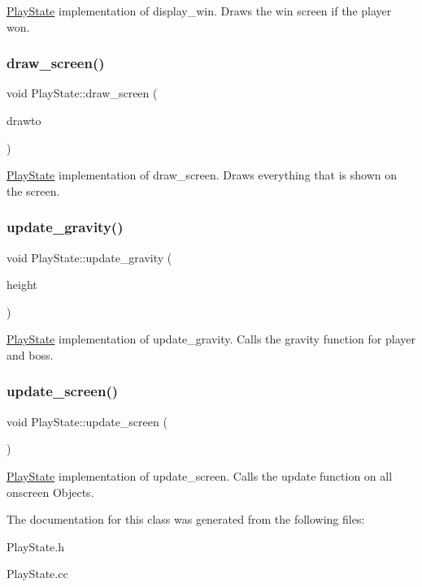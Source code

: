 \hyperlink{classPlayState}{Play\+State} implementation of display\+\_\+win. Draws the win screen if the player won. \mbox{\label{classPlayState_aaa2a573ca80d8625e9580726cd501a34}} 
\subsubsection{\texorpdfstring{draw\+\_\+screen()}{draw\_screen()}}
{\footnotesize\ttfamily void Play\+State\+::draw\+\_\+screen (\begin{DoxyParamCaption}\item[{sf\+::\+Render\+Window \&}]{drawto }\end{DoxyParamCaption})}

\hyperlink{classPlayState}{Play\+State} implementation of draw\+\_\+screen. Draws everything that is shown on the screen. \mbox{\label{classPlayState_a493525123b54430675cd78747aee4571}} 
\subsubsection{\texorpdfstring{update\+\_\+gravity()}{update\_gravity()}}
{\footnotesize\ttfamily void Play\+State\+::update\+\_\+gravity (\begin{DoxyParamCaption}\item[{float const}]{height }\end{DoxyParamCaption})}

\hyperlink{classPlayState}{Play\+State} implementation of update\+\_\+gravity. Calls the gravity function for player and boss. \mbox{\label{classPlayState_af27c539c003adda5ca10736ef8d2a9b9}} 
\subsubsection{\texorpdfstring{update\+\_\+screen()}{update\_screen()}}
{\footnotesize\ttfamily void Play\+State\+::update\+\_\+screen (\begin{DoxyParamCaption}{ }\end{DoxyParamCaption})}

\hyperlink{classPlayState}{Play\+State} implementation of update\+\_\+screen. Calls the update function on all onscreen Objects. 

The documentation for this class was generated from the following files\+:\begin{DoxyCompactItemize}
\item 
Play\+State.\+h\item 
Play\+State.\+cc\end{DoxyCompactItemize}
